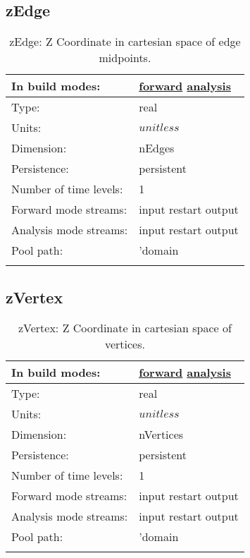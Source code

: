 \subsection[zEdge]{zEdge}
\label{subsec:var_sec_mesh_zEdge}
\begin{center}
\begin{longtable}{| p{2.0in} | p{4.0in} |}
        \hline 
        In build modes: & \hyperref[subsec:forward_var_tab_mesh]{forward} \hyperref[subsec:analysis_var_tab_mesh]{analysis} \\
        \hline 
        Type: & real \\
        \hline 
        Units: & $unitless$ \\
        \hline 
        Dimension: & nEdges \\
        \hline 
        Persistence: & persistent \\
        \hline 
        Number of time levels: & 1 \\
        \hline 
		 Forward mode streams: &  input restart output \\
        \hline 
		 Analysis mode streams: &  input restart output \\
        \hline 
            Pool path: & 'domain %
 \\
		 \hline 
    \caption{zEdge: Z Coordinate in cartesian space of edge midpoints.}
\end{longtable}
\end{center}
\subsection[zVertex]{zVertex}
\label{subsec:var_sec_mesh_zVertex}
\begin{center}
\begin{longtable}{| p{2.0in} | p{4.0in} |}
        \hline 
        In build modes: & \hyperref[subsec:forward_var_tab_mesh]{forward} \hyperref[subsec:analysis_var_tab_mesh]{analysis} \\
        \hline 
        Type: & real \\
        \hline 
        Units: & $unitless$ \\
        \hline 
        Dimension: & nVertices \\
        \hline 
        Persistence: & persistent \\
        \hline 
        Number of time levels: & 1 \\
        \hline 
		 Forward mode streams: &  input restart output \\
        \hline 
		 Analysis mode streams: &  input restart output \\
        \hline 
            Pool path: & 'domain %
 \\
		 \hline 
    \caption{zVertex: Z Coordinate in cartesian space of vertices.}
\end{longtable}
\end{center}
